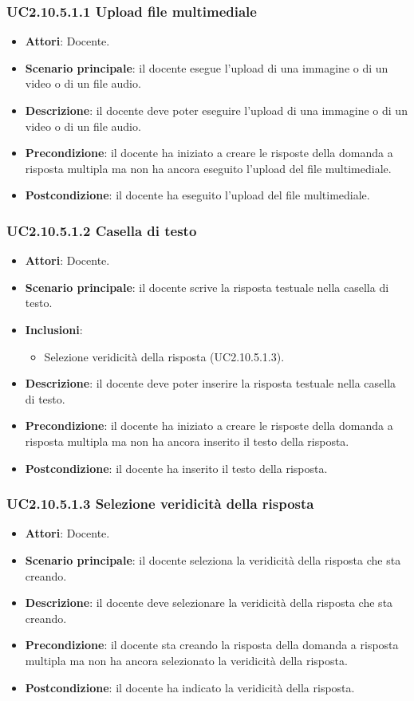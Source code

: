 \subsubsection{UC2.10.5.1.1 Upload file multimediale}
\begin{itemize}
\item \textbf{Attori}: Docente.
\item \textbf{Scenario principale}: il docente esegue l'upload di una immagine o di un video o di un file audio.
\item \textbf{Descrizione}: il docente deve poter eseguire l'upload di una immagine o di un video o di un file audio.
\item \textbf{Precondizione}: il docente ha iniziato a creare le risposte della domanda a risposta multipla ma non ha ancora eseguito l'upload del file multimediale.
\item \textbf{Postcondizione}: il docente ha eseguito l'upload del file multimediale.
\end{itemize}
\subsubsection{UC2.10.5.1.2 Casella di testo}
\begin{itemize}
\item \textbf{Attori}: Docente.
\item \textbf{Scenario principale}: il docente scrive la risposta testuale nella casella di testo.
\item \textbf{Inclusioni}:
\begin{itemize}
\item Selezione veridicità della risposta (UC2.10.5.1.3).
\end{itemize}
\item \textbf{Descrizione}: il docente deve poter inserire la risposta testuale nella casella di testo.
\item \textbf{Precondizione}: il docente ha iniziato a creare le risposte della domanda a risposta multipla ma non ha ancora inserito il testo della risposta.
\item \textbf{Postcondizione}: il docente ha inserito il testo della risposta.
\end{itemize}
\subsubsection{UC2.10.5.1.3 Selezione veridicità della risposta}
\begin{itemize}
\item \textbf{Attori}: Docente.
\item \textbf{Scenario principale}: il docente seleziona la veridicità della risposta che sta creando.
\item \textbf{Descrizione}: il docente deve selezionare la veridicità della risposta che sta creando.
\item \textbf{Precondizione}: il docente sta creando la risposta della domanda a risposta multipla ma non ha ancora selezionato la veridicità della risposta.
\item \textbf{Postcondizione}: il docente ha indicato la veridicità della risposta.
\end{itemize}
